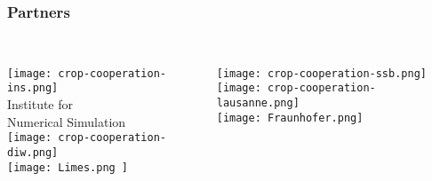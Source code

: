 \begin{frame}\frametitle{Partners}\vspace{1.75cm}

\begin{columns}[t]

\centering \\  \vspace{-1.9cm}
	\texttt{[image: crop-cooperation-ins.png]} \\\vspace{-0.5cm}
	\footnotesize{Institute for \\ Numerical Simulation}\vspace{0.3cm}   \\ \vspace{0.5cm}
	\texttt{[image: crop-cooperation-diw.png]} \\ \vspace{0.95cm}
 	\texttt{[image: 
 	Limes.png
 	]}

	\centering \\ \vspace{-1.5cm}
	\texttt{[image: crop-cooperation-ssb.png]} \\ \vspace{0.85cm}
 	\texttt{[image: crop-cooperation-lausanne.png]} \\
 	\vspace{0.85cm}
 	\texttt{[image: 
 	Fraunhofer.png]}

\centering \\

\end{columns}

\end{frame}

